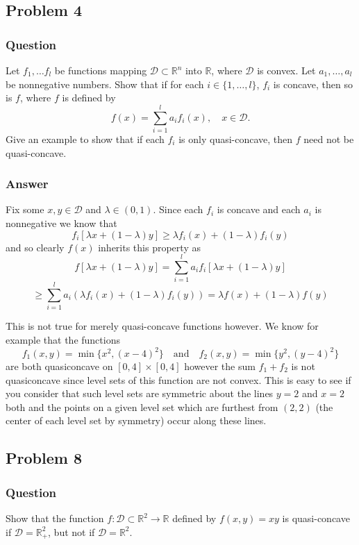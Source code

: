 \documentclass[12pt]{article}
\begin{document}
\subsection{Problem 4}
\subsubsection{Question}
Let $f_1, \dots f_l$ be functions mapping $\mathcal{D} \subset \mathbb{R}^n$ into $\mathbb{R}$, where $\mathcal{D}$ is convex. Let $a_1,\dots, a_l$ be nonnegative numbers. Show that if for each $i \in \{1,\dots,l\}$, $f_i$ is concave, then so is $f$, where $f$ is defined by 
\[f(x)= \sum_{i=1}^l a_i f_i(x), \quad x \in \mathcal{D}.\]
Give an example to show that if each $f_i$ is only quasi-concave, then $f$ need not be quasi-concave.
\subsubsection{Answer}
Fix some $x,y \in \mathcal{D}$ and $\lambda \in (0,1)$. Since each $f_i$ is concave and each $a_i$ is nonnegative we know that 
\[f_i[\lambda x + (1-\lambda)y]\geq \lambda f_i(x) + (1-\lambda) f_i(y)\]
and so clearly $f(x)$ inherits this property as 
\[ f[\lambda x + (1-\lambda)y] = \sum_{i=1}^l a_i f_i[\lambda x + (1-\lambda)y]   \]
\[  \geq \sum_{i=1}^l a_i ( \lambda f_i(x) + (1-\lambda)f_i(y)) = \lambda f(x) + (1-\lambda)f(y) \]

This is not true for merely quasi-concave functions however. We know for example that the functions 
\[f_1(x,y)=\min\{ x^2, (x-4)^2 \} \quad \mathrm{and}\quad f_2(x,y)=\min\{ y^2, (y-4)^2 \} \]
are both quasiconcave on $[0,4] \times [0,4]$ however the sum $f_1+f_2$ is not quasiconcave since level sets of this function are not convex. This is easy to see if you consider that such level sets are symmetric about the lines $y=2$ and $x=2$ both and the points on a given level set which are furthest from $(2,2)$ (the center of each level set by symmetry) occur along these lines.

\subsection{Problem 8}
\subsubsection{Question}
Show that the function $f:\mathcal{D} \subset \mathbb{R}^2 \to \mathbb{R}$ defined by $f(x,y)= x y $ is quasi-concave if $\mathcal{D} = \mathbb{R}_+^2$, but not if $\mathcal{D} = \mathbb{R}^2$.
\end{document}
